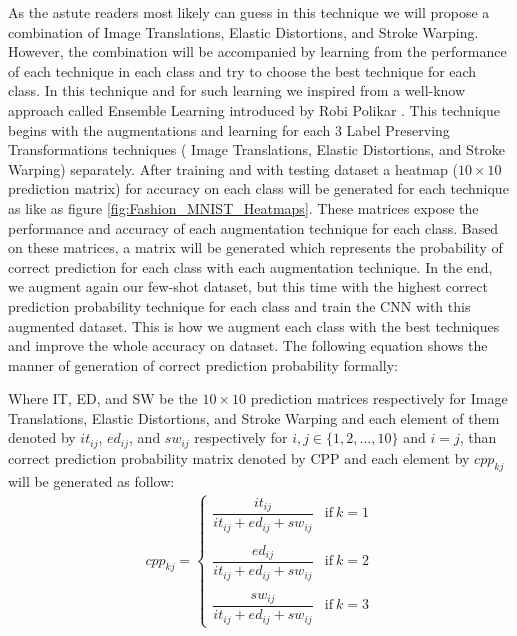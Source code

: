 As the astute readers most likely can guess in this technique we will propose a combination of Image
Translations, Elastic Distortions, and Stroke Warping. However, the combination will be accompanied
by learning from the performance of each technique in each class and try to choose the best
technique for each class. In this technique and for such learning we inspired from a well-know
approach called Ensemble Learning introduced by Robi Polikar \cite{TODO}. This technique begins with the
augmentations and learning for each $3$ Label Preserving Transformations techniques ( Image
Translations, Elastic Distortions, and Stroke Warping) separately. After training and with testing
dataset a heatmap ($10 \times 10$ prediction matrix) for accuracy on each class will be generated
for each technique as like as figure \ref{fig:Fashion_MNIST_Heatmaps}. These matrices expose the
performance and accuracy of each augmentation technique for each class. Based on these matrices, a
matrix will be generated which represents the probability of correct prediction for each class with
each augmentation technique. In the end, we augment again our few-shot dataset, but this time with
the highest correct prediction probability technique for each class and train the CNN with this
augmented dataset. This is how we augment each class with the best techniques and improve the whole
accuracy on dataset. The following equation shows the manner of generation of correct prediction probability formally:

Where IT, ED, and SW be the $10 \times 10$ prediction matrices respectively for Image Translations,
Elastic Distortions, and Stroke Warping and each element of them denoted by $it_{ij}$, $ed_{ij}$,
and $sw_{ij}$ respectively for $i,j \in \{1,2,...,10\}$ and $i=j$, than correct prediction probability
matrix denoted by CPP and each element by $cpp_{kj}$ will be generated as follow:
\begin{equation}
  \begin{aligned}
    cpp_{kj} =
    \begin{cases}
      \dfrac{it_{ij}}{it_{ij} + ed_{ij} + sw_{ij}} & \text{if}\ k=1 \\ \\
      \dfrac{ed_{ij}}{it_{ij} + ed_{ij} + sw_{ij}} & \text{if}\ k=2 \\ \\
      \dfrac{sw_{ij}}{it_{ij} + ed_{ij} + sw_{ij}} & \text{if}\ k=3
    \end{cases}
  \end{aligned}
\end{equation}

